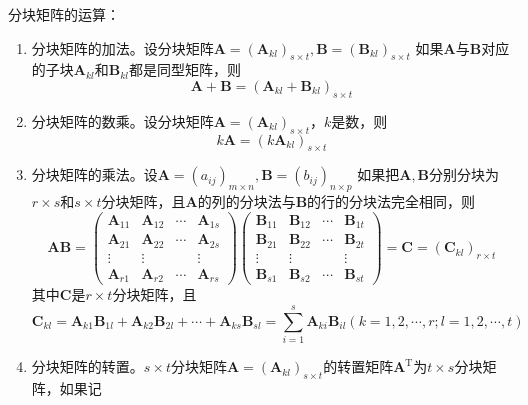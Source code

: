 \begin{theorem}
    分块矩阵的运算：
    \begin{enumerate}
        \item 分块矩阵的加法。设分块矩阵$\boldsymbol{A}={(\boldsymbol{A}_{k l})}_{s\times t},\boldsymbol{B}={(\boldsymbol{B}_{k l})}_{s\times t}$
        如果$\boldsymbol{A}$与$\boldsymbol{B}$对应的子块$\boldsymbol{A}_{kl}$和$\boldsymbol{B}_{kl}$都是同型矩阵，则
        $$\boldsymbol{A}+\boldsymbol{B}={(\boldsymbol{A}_{k l}+\boldsymbol{B}_{kl})}_{s\times t}$$
        \item 分块矩阵的数乘。设分块矩阵$\boldsymbol{A}={(\boldsymbol{A}_{k l})}_{s\times t}$，$k$是数，则
        $$k\boldsymbol{A}={(k\boldsymbol{A}_{k l})}_{s\times t}$$
        \item 分块矩阵的乘法。设$\boldsymbol{A}={(a_{ij})}_{m\times n},\boldsymbol{B}={(b_{ij})}_{n\times p}$
        如果把$\boldsymbol{A},\boldsymbol{B}$分别分块为$r\times s$和$s\times t$分块矩阵，且$\boldsymbol{A}$的列的分块法与$\boldsymbol{B}$的行的分块法完全相同，则
        $$
        \boldsymbol{A} \boldsymbol{B}=\left(\begin{array}{cccc}
        \boldsymbol{A}_{11} & \boldsymbol{A}_{12} & \cdots & \boldsymbol{A}_{1 s} \\
        \boldsymbol{A}_{21} & \boldsymbol{A}_{22} & \cdots & \boldsymbol{A}_{2 s} \\
        \vdots & \vdots & & \vdots \\
        \boldsymbol{A}_{r 1} & \boldsymbol{A}_{r 2} & \cdots & \boldsymbol{A}_{r s}
        \end{array}\right)\left(\begin{array}{cccc}
        \boldsymbol{B}_{11} & \boldsymbol{B}_{12} & \cdots & \boldsymbol{B}_{1 t} \\
        \boldsymbol{B}_{21} & \boldsymbol{B}_{22} & \cdots & \boldsymbol{B}_{2 t} \\
        \vdots & \vdots & & \vdots \\
        \boldsymbol{B}_{s 1} & \boldsymbol{B}_{s 2} & \cdots & \boldsymbol{B}_{s t}
        \end{array}\right)=\boldsymbol{C}=\left(\boldsymbol{C}_{k l}\right)_{r \times t}
        $$
        其中$\boldsymbol{C}$是$r\times t$分块矩阵，且
        $$\boldsymbol{C}_{kl}=\boldsymbol{A}_{k1}\boldsymbol{B}_{1l}+\boldsymbol{A}_{k2}\boldsymbol{B}_{2l}+\cdots+\boldsymbol{A}_{ks}\boldsymbol{B}_{sl}=\sum _{i=1}^s \boldsymbol{A}_{ki}\boldsymbol{B}_{il}(k=1,2,\cdots,r;l=1,2,\cdots,t)$$
        \item 分块矩阵的转置。$s\times t$分块矩阵$\boldsymbol{A}={(\boldsymbol{A}_{k l})}_{s\times t}$的转置矩阵$\boldsymbol{A}^\mathrm{T}$为$t\times s$分块矩阵，如果记

\end{enumerate}
\end{theorem}
